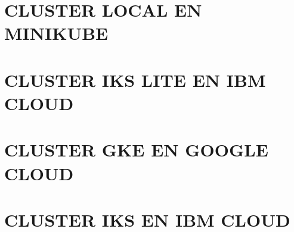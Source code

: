 \documentclass[spanish,twoside,12pt,a4paper]{book}
\begin{document}

\appendix

\chapter{CLUSTER LOCAL EN MINIKUBE}

\chapter{CLUSTER IKS LITE EN IBM CLOUD}

\chapter{CLUSTER GKE EN GOOGLE CLOUD}

\chapter{CLUSTER IKS EN IBM CLOUD}
\end{document}
